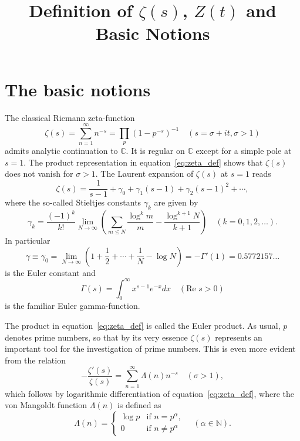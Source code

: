 \documentclass[11pt]{article}
\title{Definition of $\zeta(s)$, $Z(t)$ and Basic Notions}
\author{}
\date{}
\begin{document}
\maketitle

\section{The basic notions}\label{sec:basic}

The classical Riemann zeta-function
\begin{equation}\label{eq:zeta_def}
\zeta(s) = \sum_{n=1}^{\infty} n^{-s} = \prod_p (1 - p^{-s})^{-1} \quad (s = \sigma + it, \sigma > 1)
\end{equation}
admits analytic continuation to $\mathbb{C}$. It is regular on $\mathbb{C}$ except for a simple pole at $s = 1$. The product representation in equation~\eqref{eq:zeta_def} shows that $\zeta(s)$ does not vanish for $\sigma > 1$. The Laurent expansion of $\zeta(s)$ at $s = 1$ reads
\begin{equation}\label{eq:laurent}
\zeta(s) = \frac{1}{s-1} + \gamma_0 + \gamma_1(s-1) + \gamma_2(s-1)^2 + \cdots,
\end{equation}
where the so-called Stieltjes constants $\gamma_k$ are given by
\begin{equation}\label{eq:stieltjes}
\gamma_k = \frac{(-1)^k}{k!} \lim_{N \to \infty} \left( \sum_{m \leq N} \frac{\log^k m}{m} - \frac{\log^{k+1} N}{k+1} \right) \quad (k = 0, 1, 2, \ldots).
\end{equation}
In particular
\begin{equation}\label{eq:euler_constant}
\gamma \equiv \gamma_0 = \lim_{N \to \infty} \left( 1 + \frac{1}{2} + \cdots + \frac{1}{N} - \log N \right) = -\Gamma'(1) = 0.5772157\ldots
\end{equation}
is the Euler constant and
\begin{equation}\label{eq:gamma_func}
\Gamma(s) = \int_0^{\infty} x^{s-1} e^{-x} dx \quad (\text{Re } s > 0)
\end{equation}
is the familiar Euler gamma-function.

The product in equation~\eqref{eq:zeta_def} is called the Euler product. As usual, $p$ denotes prime numbers, so that by its very essence $\zeta(s)$ represents an important tool for the investigation of prime numbers. This is even more evident from the relation
\begin{equation}\label{eq:log_deriv}
-\frac{\zeta'(s)}{\zeta(s)} = \sum_{n=1}^{\infty} \Lambda(n) n^{-s} \quad (\sigma > 1),
\end{equation}
which follows by logarithmic differentiation of equation~\eqref{eq:zeta_def}, where the von Mangoldt function $\Lambda(n)$ is defined as
\begin{equation}\label{eq:mangoldt}
\Lambda(n) = \begin{cases}
\log p & \text{if } n = p^{\alpha}, \\
0 & \text{if } n \neq p^{\alpha}
\end{cases} \quad (\alpha \in \mathbb{N}).
\end{equation}
\end{document}
